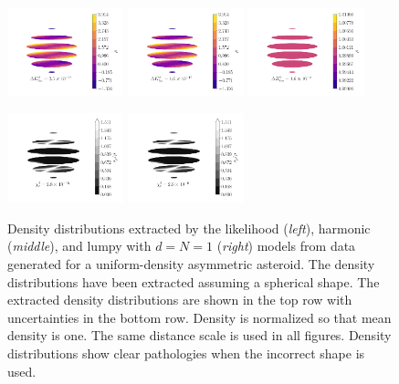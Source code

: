 \documentclass[fleqn,usenatbib]{mnras}
\begin{document}
\begin{figure}
  \centering
  \includegraphics[width=0.3\textwidth]{figs/asym-sph-likelihood.pdf}\hfill
  \includegraphics[width=0.3\textwidth]{figs/asym-sph-harmonic.pdf}\hfill
  \includegraphics[width=0.3\textwidth]{figs/asym-sph-lumpy.pdf}
  
  \includegraphics[width=0.3\textwidth]{figs/asym-sph-unc-likelihood.pdf}\hfill
  \includegraphics[width=0.3\textwidth]{figs/asym-sph-unc-harmonic.pdf}\hfill
  \hspace{0.3\textwidth}

  \caption{Density distributions extracted by the likelihood (\textit{left}), harmonic (\textit{middle}), and lumpy with $d=N=1$ (\textit{right}) models from data generated for a uniform-density asymmetric asteroid. The density distributions have been extracted assuming a spherical shape. The extracted density distributions are shown in the top row with uncertainties in the bottom row. Density is normalized so that mean density is one. The same distance scale is used in all figures. Density distributions show clear pathologies when the incorrect shape is used. }
  \label{fig:sphere-density}
\end{figure}
\end{document}
